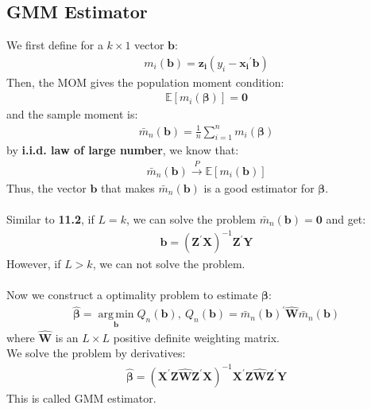 \documentclass{article}
\begin{document}
\subsection{GMM Estimator}
We first define for a $k \times 1$ vector $\boldsymbol{b}$:
	\begin{align*}
		m_i(\boldsymbol{b}) = \boldsymbol{z_i} (y_i - \boldsymbol{x_i}^\prime \boldsymbol{b})
	\end{align*} 
Then, the MOM gives the population moment condition:
	\begin{align*}
		\mathbb{E} [m_i(\boldsymbol{\beta})] = \boldsymbol{0}
	\end{align*}
and the sample moment is:
	\begin{align*}
		\bar{m}_n (\boldsymbol{b}) = \frac{1}{n} \sum^n_{i=1} m_i(\boldsymbol{\beta})
	\end{align*}
by \textbf{i.i.d. law of large number}, we know that:
	\begin{align*}
		\bar{m}_n(\boldsymbol{b}) \xrightarrow{P} \mathbb{E} [m_i (\boldsymbol{b})]
	\end{align*}
Thus, the vector $\boldsymbol{b}$ that makes $\bar{m}_n(\boldsymbol{b})$ is a good estimator for $\boldsymbol{\beta}$.\\\\
Similar to \textbf{11.2}, if $L = k$, we can solve the problem $\bar{m}_n(\boldsymbol{b}) = \boldsymbol{0}$ and get:
	\begin{align*}
		\boldsymbol{b} = (\boldsymbol{Z}^\prime \boldsymbol{X})^{-1} \boldsymbol{Z}^\prime \boldsymbol{Y}
	\end{align*}
However, if $L > k$, we can not solve the problem.\\\\
Now we construct a optimality problem to estimate $\boldsymbol{\beta}$:
	\begin{align*}
		\hat{\boldsymbol{\beta}} = \mathop{arg\,min}\limits_{\boldsymbol{b}} Q_n (\boldsymbol{b}),\ Q_n(\boldsymbol{b}) = \bar{m}_n(\boldsymbol{b})^\prime \hat{\boldsymbol{W}} \bar{m}_n(\boldsymbol{b})
	\end{align*}
where $\hat{\boldsymbol{W}}$ is an $L \times L$ positive definite weighting matrix.\\
We solve the problem by derivatives:
	\begin{align*}
		\hat{\boldsymbol{\beta}} = (\boldsymbol{X}^\prime \boldsymbol{Z} \hat{\boldsymbol{W}} \boldsymbol{Z}^\prime \boldsymbol{X})^{-1} \boldsymbol{X}^\prime \boldsymbol{Z} \hat{\boldsymbol{W}} \boldsymbol{Z}^\prime \boldsymbol{Y}
	\end{align*}
This is called GMM estimator.
\end{document}
